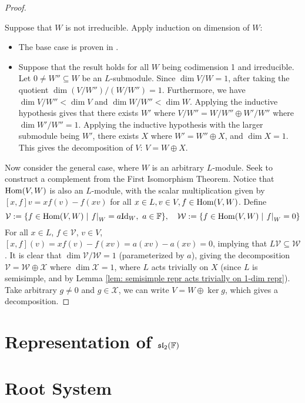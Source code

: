 \documentclass{article}
\begin{document}
\begin{proof}
\begin{addmargin}{2em}
         Suppose that $W$ is not irreducible. Apply induction on dimension of $W$:
        \begin{itemize}
            \item The base case is proven in .
            \item Suppose that the result holds for all $W$ being codimension 1 and irreducible. Let $0 \neq W'' \subseteq W$ be an $L$-submodule. Since $\dim V/W = 1$, after taking the quotient $\dim (V/W'')/(W/W'') = 1$. Furthermore, we have $\dim V/W'' < \dim V$ and $\dim W/W'' < \dim W$. Applying the inductive hypothesis gives that there exists $W'$ where $V/W'' = W/W'' \oplus W'/W''$ where $\dim W'/W'' = 1$. Applying the inductive hypothesis with the larger submodule being $W'$, there exists $X$ where $W' = W'' \oplus X$, and $\dim X = 1$. This gives the decomposition of $V$: $V = W \oplus X$.
        \end{itemize}
    \end{addmargin}
     Now consider the general case, where $W$ is an arbitrary $L$-module. Seek to construct a complement from the First Isomorphism Theorem. Notice that $\mathrm{Hom}(V, W)$ is also an $L$-module, with the scalar multiplication given by $[x, f]v = xf(v) - f(xv)$ for all $x \in L, v \in V, f \in \mathrm{Hom}(V, W)$. Define
    \[
        \mathcal{V} := \{ f \in \mathrm{Hom}(V, W) \mid \left.f\right|_{W} = a \mathrm{Id}_W, \ a \in \mathbb{F} \}, \quad \mathcal{W} := \{ f \in \mathrm{Hom}(V, W) \mid \left.f\right|_{W} = 0 \}
    \]
    For all $x \in L$, $f \in \mathcal{V}$, $v \in V$, $[x, f](v) = xf(v) - f(xv) = a(xv) - a(xv) = 0$, implying that $L\mathcal{V} \subseteq \mathcal{W}$. It is clear that $\dim \mathcal{V}/\mathcal{W} = 1$ (parameterized by $a$), giving the decomposition $\mathcal{V} = \mathcal{W} \oplus \mathcal{X}$ where $\dim \mathcal{X} = 1$, where $L$ acts trivially on $X$ (since $L$ is semisimple, and by Lemma \ref{lem: semisimple repr acts trivially on 1-dim repr}). Take arbitrary $g \neq 0$ and $g \in \mathcal{X}$, we can write $V = W \oplus \ker g$, which gives a decomposition.
\end{proof}

\section{Representation of $\mathfrak{sl}_2(\mathbb{F})$}

\section{Root System}
\end{document}
